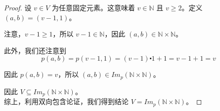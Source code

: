 \begin{example}
\begin{proof}
        设 $v \in V$ 为任意固定元素。这意味着 $v \in \mathbb{N}$ 且 $v \ge 2$。定义 $(a, b) = (v - 1, 1)$。

        注意，$v - 1 \ge 1$，所以 $v-1 \in \mathbb{N}$，因此 $(a, b) \in \mathbb{N} \times \mathbb{N}$。

        此外，我们还注意到
        \[p(a, b) = p(v - 1, 1) = (v - 1) \centerdot 1 + 1 = v - 1 + 1 = v\]
        
        因此 $p(a, b) = v$，所以 $(a,b) \in Im_p(\mathbb{N} \times \mathbb{N})$。
        
        因此 $V \subseteq Im_p(\mathbb{N} \times \mathbb{N})$。\\

        综上，利用双向包含论证，我们得到结论 $V = Im_p(\mathbb{N} \times \mathbb{N})$。
    \end{proof}
\end{example}